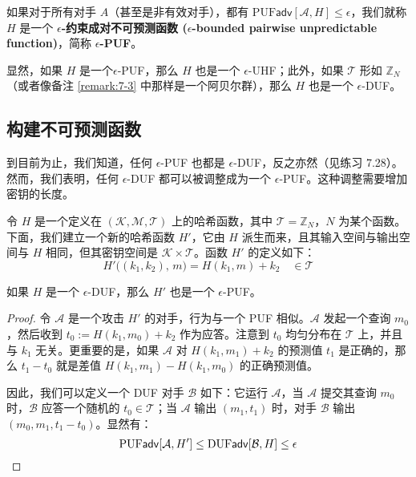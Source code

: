 \begin{definition}\label{def:7-7}
如果对于所有对手 $A$（甚至是非有效对手），都有 $\mathrm{PUF}\mathsf{adv}[\mathcal{A},H]\leq\epsilon$，我们就称 $H$ 是一个 \textbf{$\epsilon$-约束成对不可预测函数 ($\epsilon$-bounded pairwise unpredictable function)}，简称 \textbf{$\epsilon$-PUF}。
\end{definition}

显然，如果 $H$ 是一个$\epsilon$-PUF，那么 $H$ 也是一个 $\epsilon$-UHF；此外，如果 $\mathcal{T}$ 形如 $\mathbb{Z}_N$（或者像备注 \ref{remark:7-3} 中那样是一个阿贝尔群），那么 $H$ 也是一个 $\epsilon$-DUF。

\subsection{构建不可预测函数}\label{subsec:7-6-2}

到目前为止，我们知道，任何 $\epsilon$-PUF 也都是 $\epsilon$-DUF，反之亦然（见练习 7.28）。然而，我们表明，任何 $\epsilon$-DUF 都可以被调整成为一个 $\epsilon$-PUF。这种调整需要增加密钥的长度。

令 $H$ 是一个定义在 $(\mathcal{K},\mathcal{M},\mathcal{T})$ 上的哈希函数，其中 $\mathcal{T}=\mathbb{Z}_N$，$N$ 为某个函数。下面，我们建立一个新的哈希函数 $H'$，它由 $H$ 派生而来，且其输入空间与输出空间与 $H$ 相同，但其密钥空间是 $\mathcal{K}\times\mathcal{T}$。函数 $H'$ 的定义如下：
\begin{equation}\label{eq:7-32}
H'\big((k_1,k_2),\,m\big)=H(k_1,m)+k_2\quad\in\mathcal{T}
\end{equation}

\begin{lemma}\label{lemma:7-11}
如果 $H$ 是一个 $\epsilon$-DUF，那么 $H'$ 也是一个 $\epsilon$-PUF。
\end{lemma}

\begin{proof}
令 $\mathcal{A}$ 是一个攻击 $H'$ 的对手，行为与一个 PUF 相似。$\mathcal{A}$ 发起一个查询 $m_0$，然后收到 $t_0:=H(k_1,m_0)+k_2$ 作为应答。注意到 $t_0$ 均匀分布在 $\mathcal{T}$ 上，并且与 $k_1$ 无关。更重要的是，如果 $\mathcal{A}$ 对 $H(k_1,m_1)+k_2$ 的预测值 $t_1$ 是正确的，那么 $t_1-t_0$ 就是差值 $H(k_1,m_1)-H(k_1,m_0)$ 的正确预测值。

因此，我们可以定义一个 DUF 对手 $\mathcal{B}$ 如下：它运行 $\mathcal{A}$，当 $\mathcal{A}$ 提交其查询 $m_0$ 时，$\mathcal{B}$ 应答一个随机的 $t_0\in\mathcal{T}$；当 $\mathcal{A}$ 输出 $(m_1,t_1)$ 时，对手 $\mathcal{B}$ 输出 $(m_0,m_1,t_1-t_0)$。显然有：
\[
\mathrm{PUF}\mathsf{adv}[\mathcal{A},H']\leq\mathrm{DUF}\mathsf{adv}[\mathcal{B},H]\leq\epsilon\qedhere
\]
\end{proof}

